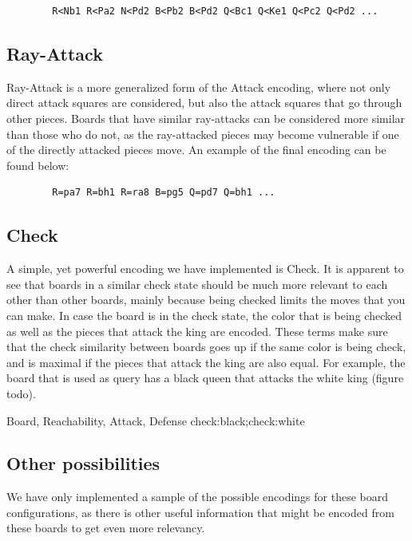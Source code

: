 \documentclass[11pt]{article}
\begin{document}
    \begin{verbatim}
        R<Nb1 R<Pa2 N<Pd2 B<Pb2 B<Pd2 Q<Bc1 Q<Ke1 Q<Pc2 Q<Pd2 ...
    \end{verbatim}

    \subsection{Ray-Attack}

    Ray-Attack is a more generalized form of the Attack encoding, where not only direct attack squares are considered, but also the attack squares that go through other pieces. Boards that have similar ray-attacks can be considered more similar than those who do not, as the ray-attacked pieces may become vulnerable if one of the directly attacked pieces move. An example of the final encoding can be found below:

     \begin{verbatim}
        R=pa7 R=bh1 R=ra8 B=pg5 Q=pd7 Q=bh1 ...
    \end{verbatim}

    \subsection{Check}

    A simple, yet powerful encoding we have implemented is Check. It is apparent to see that boards in a similar check state should be much more relevant to each other than other boards, mainly because being checked limits the moves that you can make. In case the board is in the check state, the color that is being checked as well as the pieces that attack the king are encoded. These terms make sure that the check similarity between boards goes up if the same color is being check, and is maximal if the pieces that attack the king are also equal. For example, the board that is used as query has a black queen that attacks the white king (figure todo).

    Board, Reachability, Attack, Defense
    check:black;check:white

    \subsection{Other possibilities}

    We have only implemented a sample of the possible encodings for these board configurations, as there is other useful information that might be encoded from these boards to get even more relevancy.
\end{document}
